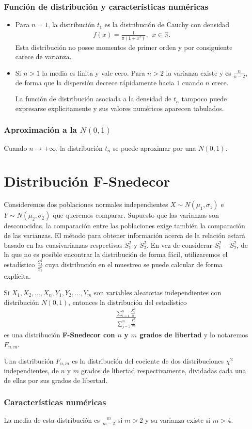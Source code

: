 \subsubsection{Función de distribución y características numéricas}

\begin{itemize}
    \item Para $n = 1$, la distribución $t_1$ es la distribución de Cauchy con densidad
          \begin{align*}
              f(x) = \frac{1}{\pi (1 + x^2)}, \ \ x \in \mathbb{R}.
          \end{align*}
          Esta distribución no posee momentos de primer orden y por consiguiente carece de varianza.
    \item Si $n > 1$ la media es finita y vale cero. Para $n > 2$ la varianza existe y es $\frac{n}{n-2}$, de forma que la dispersión decrece rápidamente hacia $1$ cuando $n$ crece.

          La función de distribución asociada a la densidad de $t_n$ tampoco puede expresarse explícitamente y sus valores numéricos aparecen tabulados.
\end{itemize}

\subsubsection{Aproximación a la $N(0,1)$}
Cuando $n \to +\infty$, la distribución $t_n$ se puede aproximar por una $N(0,1)$.
\section{Distribución F-Snedecor}
Consideremos dos poblaciones normales independientes $X \sim N(\mu_1,\sigma_1)$ e $Y \sim N(\mu_2,\sigma_2)$ que queremos comparar. Supuesto que las varianzas son desconocidas, la comparación entre las poblaciones exige también la comparación de las varianzas. El método para obtener información acerca de la relación estará basado en las cuasivarianzas respectivas $S_1^2$ y $S_2^2$. En vez de considerar $S_1^2 - S_2^2$, de la que no es posible encontrar la distribución de forma fácil, utilizaremos el estadístico $\frac{S_1^2}{S_2^2}$ cuya distribución en el muestreo se puede calcular de forma explícita.

\begin{defi}
    Si $X_1,X_2,...,X_n,Y_1,Y_2,...,Y_m$ son variables aleatorias independientes con distribución $N(0,1)$, entonces la distribución del estadístico
    \begin{align*}
        \frac{\sum_{i=1}^{n}{\frac{X_i^2}{n}}}{\sum_{j=1}^{m}{\frac{Y_j^2}{m}}}
    \end{align*}
    es una distribución \textbf{F-Snedecor con $n$ y $m$ grados de libertad} y lo notaremos $F_{n,m}$.
\end{defi}
Una distribución $F_{n,m}$ es la distribución del cociente de dos distribuciones $\chi^2$ independientes, de $n$ y $m$ grados de libertad respectivamente, dividadas cada una de ellas por sus grados de libertad.

\subsubsection{Características numéricas}
La media de esta distribución es $\frac{m}{m-2}$ si $m > 2$ y su varianza existe si $m > 4$.